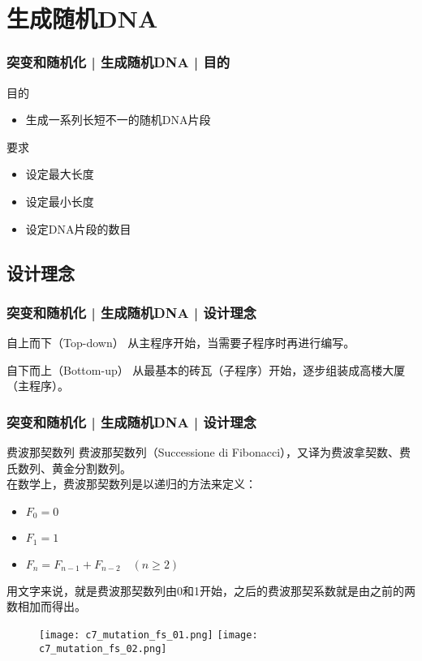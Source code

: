 \section{生成随机DNA}
\begin{frame}
  \frametitle{突变和随机化 | 生成随机DNA | 目的}
  \begin{block}{目的}
    \begin{itemize}
      \item 生成一系列长短不一的随机DNA片段
    \end{itemize}
  \end{block}
  \pause
  \begin{block}{要求}
    \begin{itemize}
      \item 设定最大长度
      \item 设定最小长度
      \item 设定DNA片段的数目
    \end{itemize}
  \end{block}
\end{frame}

\subsection{设计理念}
\begin{frame}
  \frametitle{突变和随机化 | 生成随机DNA | \alert{设计理念}}
  \begin{block}{自上而下（Top-down）}
    从主程序开始，当需要子程序时再进行编写。
  \end{block}
  \pause
  \begin{block}{自下而上（Bottom-up）}
    从最基本的砖瓦（子程序）开始，逐步组装成高楼大厦（主程序）。
  \end{block}
\end{frame}

\begin{frame}
  \frametitle{突变和随机化 | 生成随机DNA | 设计理念}
  \begin{block}{费波那契数列}
    费波那契数列（Successione di Fibonacci），又译为费波拿契数、费氏数列、黄金分割数列。\\
在数学上，费波那契数列是以递归的方法来定义：
\begin{itemize}
  \item $F_{0}=0$
  \item $F_{1}=1$
  \item $F_{n}=F_{{n-1}}+F_{{n-2}}\quad (n\geq 2)$
\end{itemize}
用文字来说，就是费波那契数列由0和1开始，之后的费波那契系数就是由之前的两数相加而得出。
  \end{block}
  \begin{figure}
    \centering
    \texttt{[image: c7\_mutation\_fs\_01.png]}\quad
    \texttt{[image: c7\_mutation\_fs\_02.png]}
  \end{figure}
\end{frame}

